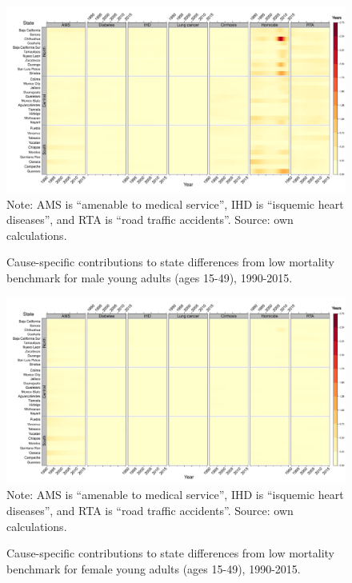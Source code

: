 \documentclass[11.5pt]{article}
\begin{document}
{\begin{figure}
\centering
\caption{Cause-specific contributions to state differences from low mortality benchmark for male young adults (ages 15-49), 1990-2015.}
\label{fig:e15_39_males}
\includegraphics[scale=.3]{Figures/YoungAdult_Male_heatmap.pdf}
Note: AMS is ``amenable to medical service'', IHD is ``isquemic heart diseases'', and RTA is ``road traffic accidents''. Source: own calculations.
\end{figure}

\begin{figure}
\centering
\caption{Cause-specific contributions to state differences from low mortality benchmark for female young adults (ages 15-49), 1990-2015.}
\label{fig:e15_39_females}
\includegraphics[scale=.3]{Figures/YoungAdult_Female_heatmap.pdf}
Note: AMS is ``amenable to medical service'', IHD is ``isquemic heart diseases'', and RTA is ``road traffic accidents''. Source: own calculations.
\end{figure}



}
\end{document}
